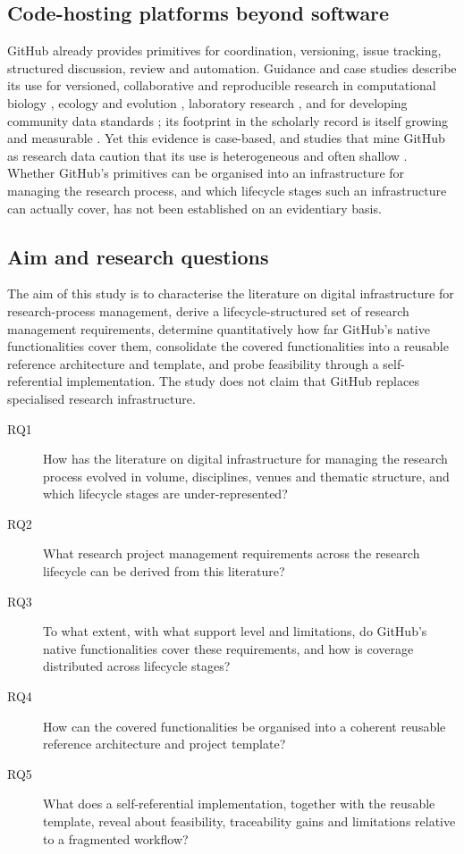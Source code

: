 \documentclass[pdflatex,sn-mathphys-num]{sn-jnl}%
\begin{document}
\subsection{Code-hosting platforms beyond software}\label{sec:github}

GitHub already provides primitives for coordination, versioning, issue tracking, structured discussion, review and automation. Guidance and case studies describe its use for versioned, collaborative and reproducible research in computational biology \citep{sandve2013,blischak2016,perezriverol2016}, ecology and evolution \citep{braga2023}, laboratory research \citep{chen2025}, and for developing community data standards \citep{crystalornelas2021}; its footprint in the scholarly record is itself growing and measurable \citep{escamilla2022}. Yet this evidence is case-based, and studies that mine GitHub as research data caution that its use is heterogeneous and often shallow \citep{kalliamvakou2016,trisovic2022}. Whether GitHub's primitives can be organised into an infrastructure for managing the research process, and which lifecycle stages such an infrastructure can actually cover, has not been established on an evidentiary basis.

\subsection{Aim and research questions}\label{sec:rqs}

The aim of this study is to characterise the literature on digital infrastructure for research-process management, derive a lifecycle-structured set of research management requirements, determine quantitatively how far GitHub's native functionalities cover them, consolidate the covered functionalities into a reusable reference architecture and template, and probe feasibility through a self-referential implementation. The study does not claim that GitHub replaces specialised research infrastructure.

\begin{description}
  \item[RQ1] How has the literature on digital infrastructure for managing the research process evolved in volume, disciplines, venues and thematic structure, and which lifecycle stages are under-represented?
  \item[RQ2] What research project management requirements across the research lifecycle can be derived from this literature?
  \item[RQ3] To what extent, with what support level and limitations, do GitHub's native functionalities cover these requirements, and how is coverage distributed across lifecycle stages?
  \item[RQ4] How can the covered functionalities be organised into a coherent reusable reference architecture and project template?
  \item[RQ5] What does a self-referential implementation, together with the reusable template, reveal about feasibility, traceability gains and limitations relative to a fragmented workflow?
\end{description}
\end{document}
